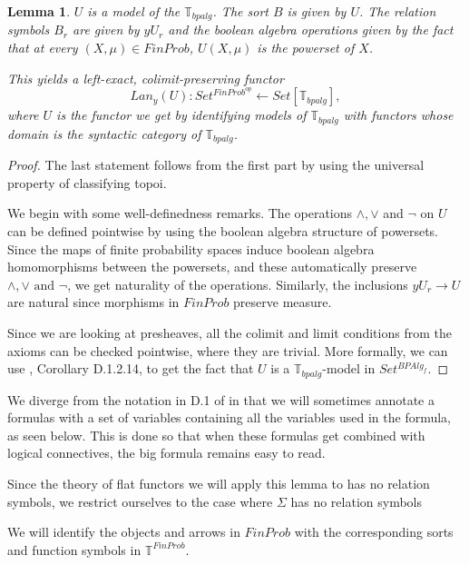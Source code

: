 \documentclass[a4paper]{amsproc}
\theoremstyle{plain}
\newtheorem{lemma}[theorem]{Lemma}
\theoremstyle{definition}
\theoremstyle{remark}
\numberwithin{equation}{section}
\begin{document}
\begin{lemma} \label{universal model}
$U$ is a model of the $\mathbb{T}_{bpalg}$. The sort $B$ is given by $U$. The relation symbols $B_r$ are given by $y U_r$ and the boolean algebra operations given by the fact that at every $(X,\mu) \in FinProb$, $U(X, \mu)$ is the powerset of $X$.

This yields a left-exact, colimit-preserving functor 
\[
    Lan_y(U): Set^{FinProb^{op}} \leftarrow Set[\mathbb{T}_{bpalg}],
\]
where $U$ is the functor we get by identifying models of $\mathbb{T}_{bpalg}$ with functors whose domain is the syntactic category of $\mathbb{T}_{bpalg}$.
\end{lemma}
\begin{proof}
The last statement follows from the first part by using the universal property of classifying topoi.

We begin with some well-definedness remarks. The operations $\wedge, \vee$ and $\neg$ on $U$ can be defined pointwise by using the boolean algebra structure of powersets. Since the maps of finite probability spaces induce boolean algebra homomorphisms between the powersets, and these automatically preserve $\wedge, \vee \text{ and } \neg$, we get naturality of the operations. Similarly, the inclusions $y U_r \to U$ are natural since morphisms in $FinProb$ preserve measure.

Since we are looking at presheaves, all the colimit and limit conditions from the axioms can be checked pointwise, where they are trivial. More formally, we can use \cite{elephant}, Corollary D.1.2.14, to get the fact that $U$ is a $\mathbb{T}_{bpalg}$-model in $Set^{BPAlg_f}$.
\end{proof}

We diverge from the notation in D.1 of \cite{elephant} in that we will sometimes annotate a formulas with a set of variables containing all the variables used in the formula, as seen below. This is done so that when these formulas get combined with logical connectives, the big formula remains easy to read.

Since the theory of flat functors we will apply this lemma to has no relation symbols, we restrict ourselves to the case where $\Sigma$ has no relation symbols

We will identify the objects and arrows in $FinProb$ with the corresponding sorts and function symbols in $\mathbb{T}^{FinProb}$.
\end{document}
